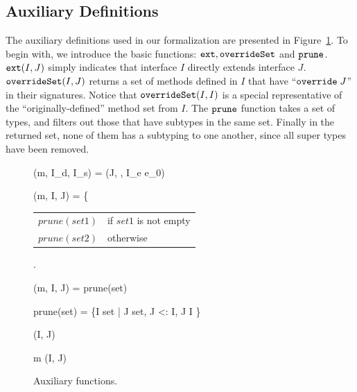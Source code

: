 \subsection{Auxiliary Definitions}\label{subsec:auxdefs}

The auxiliary definitions used in our formalization are presented in 
Figure~\ref{fig:auxfunc}. To begin with, we
introduce the basic functions: $\texttt{ext}, \texttt{overrideSet}$ and $\texttt{prune}$. $\texttt{ext}(I, J)$
simply indicates that interface $I$ directly extends interface $J$. 
$\texttt{overrideSet}(I, J)$ returns a set of methods defined in $I$ that have ``$\texttt{override} \; J$''
in their signatures. Notice that $\texttt{overrideSet}(I, I)$ is a special representative of
the ``originally-defined'' method set from $I$. The $\texttt{prune}$ function takes a set of
types, and filters out those that have subtypes in the same set. Finally in the returned set,
none of them has a subtyping to one another, since all super types have been removed.

\begin{figure}[t]
	\begin{mathpar}
		{\mbody(m, I_d, I_s) = (J,  \; , I_e \; e_0)}
	
	{\mostSpecific(m, I, J) = \left\{{\begin{tabular}{ll}
				$prune(set1)$ & if $set1$ is not empty \\ $prune(set2)$ & otherwise
			\end{tabular}}\right.}
	
		{\mostSpecificOverride(m, I, J) = prune(set)}
	
	prune(set) = \{I \in set \; | \; \nexists J \in set, J <: I, J \neq I \}
	
	{\ext(I, J)}
	
	{m \in \overrideSet(I, J)}
	\end{mathpar}
	\caption{Auxiliary functions.}\label{fig:auxfunc}
\end{figure}

